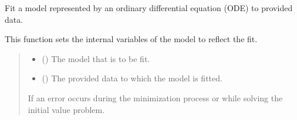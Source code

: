 \documentclass[letterpaper,10pt,english]{sphinxmanual}
\begin{document}
\begin{fulllineitems}
\label{\detokenize{ModelFitter:src.ModelFitter._fit_ode}}
\pysigstartsignatures
{}
\pysigstopsignatures
\sphinxAtStartPar
Fit a model represented by an ordinary differential equation (ODE) to provided data.

\sphinxAtStartPar
This function sets the internal variables of the model to reflect the fit.
\begin{quote}\begin{description}
\begin{itemize}
\item {} 
\sphinxAtStartPar
{} ({\hyperref[\detokenize{VPCModel:src.VPCModel.VPCModel}]{}}) \textendash{} The model that is to be fit.

\item {} 
\sphinxAtStartPar
{} (\sphinxstyleliteralemphasis{\sphinxupquote{{[}}}\sphinxstyleliteralemphasis{\sphinxupquote{{[}}}\sphinxstyleliteralemphasis{\sphinxupquote{  |  }}\sphinxstyleliteralemphasis{\sphinxupquote{{]}}}\sphinxstyleliteralemphasis{\sphinxupquote{{]}}}) \textendash{} The provided data to which the model is fitted.

\end{itemize}

\sphinxAtStartPar
{} \textendash{} If an error occurs during the minimization process or while solving the initial value problem.

\end{description}\end{quote}

\end{fulllineitems}
\end{document}
